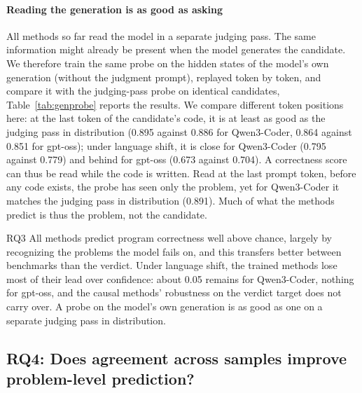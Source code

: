 \paragraph{Reading the generation is as good as asking}
All methods so far read the model in a separate judging pass. The same information might already be present when the model generates the candidate. %
We therefore train the same probe on the hidden states of the model's own
generation (without the judgment prompt), replayed token by token, and compare it with the judging-pass probe on identical candidates, Table~\ref{tab:genprobe} reports the results. We compare different token positions here: at the last token of the candidate's code, it is
at least as good as the judging pass in distribution (0.895 against 0.886 for
Qwen3-Coder, 0.864 against 0.851 for gpt-oss); under language shift, it is
close for Qwen3-Coder (0.795 against 0.779) and behind for gpt-oss (0.673
against 0.704). A correctness score can thus be read while the code is
written. Read at the last prompt token, before any code exists, the probe
has seen only the problem, yet for Qwen3-Coder it matches the judging pass in
distribution (0.891). Much of what the methods predict is thus the problem,
not the candidate.



\begin{rqanswer}{RQ3}
All methods predict program correctness well above chance, largely by recognizing the problems the model fails on, %
and this transfers better between benchmarks than the verdict. Under
language shift, the trained methods lose most of their lead over confidence:
about 0.05 remains for Qwen3-Coder, nothing for gpt-oss, and the causal
methods' robustness on the verdict target does not carry over. A probe on the model's own generation is as good as one on a separate judging pass in distribution.
\end{rqanswer}


\subsection{RQ4: Does agreement across samples improve problem-level prediction?} %
\label{sec:rq-problem}

